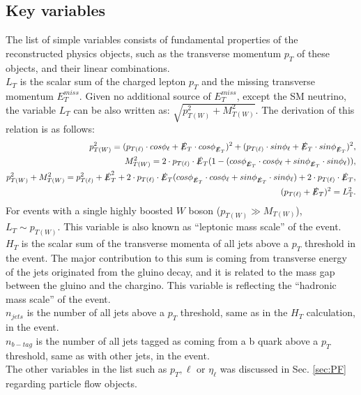 \subsection{Key variables}
\label{keyVars}
The list of simple variables consists of fundamental properties of the reconstructed physics objects, such as the transverse momentum $p_T$ of these objects, and their linear combinations.\\
{\boldmath $L_{T}$} is the scalar sum of the charged lepton $p_T$ and the missing transverse momentum $E_T^{miss}$.
Given no additional source of $E_T^{miss}$, except the SM neutrino, the variable $L_T$ can be also written as: $\sqrt{p_{T(W)}^2+M_{T(W)}^2}$. The derivation of this relation is as follows:
\begin{eqnarray}
{p_{T(W)}^2} = {(p_{T(\ell)}\cdot cos\phi_{\ell} + \slashed{E}_T \cdot cos \phi_{\slashed{E}_T})^2+(p_{T(\ell)}\cdot sin\phi_{\ell} + \slashed{E}_T \cdot sin \phi_{\slashed{E}_T})^2},\nonumber \\
{M_{T(W)}^2} = {2\cdot p_{T(\ell)}\cdot\slashed{E}_T(1-(cos\phi_{\slashed{E}_T} \cdot cos\phi_{\ell} +sin\phi_{\slashed{E}_T}  \cdot sin\phi_{\ell} ))},\nonumber \\
{p_{T(W)}^2+M_{T(W)}^2}  = {p_{T(\ell)}^2+\slashed{E}_T^2+2\cdot p_{T(\ell)}\cdot\slashed{E}_T(cos\phi_{\slashed{E}_T} \cdot cos\phi_{\ell} +sin\phi_{\slashed{E}_T}  \cdot sin\phi_{\ell} )+2\cdot p_{T(\ell)}\cdot\slashed{E}_T},\nonumber \\
{(p_{T(\ell)}+\slashed{E}_T)^2} = {L_{\rm T}^2}.
  \label{eq:LTderive}
\end{eqnarray}
For events with a single highly boosted $W$ boson ($p_{T(W)}\gg M_{T(W)}$), $L_T \sim p_{T(W)}$. This variable is also known as ``leptonic mass scale'' of the event. \\
{\boldmath $H_{T}$}  is the scalar sum of the transverse momenta of all jets above a $p_T$ threshold in the event. The major contribution to this sum is coming from transverse energy of the jets originated from the gluino decay, and it is related to the mass gap between the gluino and the chargino. This variable is reflecting the ``hadronic mass scale'' of the event. \\
{\boldmath $n_{jets}$} is the number of all jets  above a $p_T$ threshold, same as in the $H_T$ calculation, in the event.\\
{\boldmath $n_{b-tag}$} is the number of all jets tagged as coming from a b quark above a $p_T$ threshold, same as with other jets, in the event.\\
The other variables in the list such as $p_T,\ell$ or $\eta_{\ell}$ was discussed in Sec. \ref{sec:PF} regarding particle flow objects.\\
